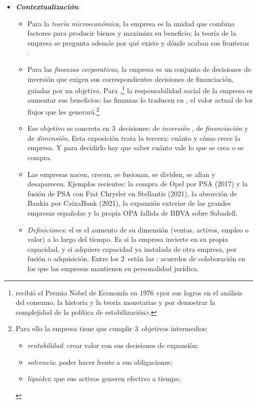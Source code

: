 \documentclass[11pt]{article}
\begin{document}
\begin{itemize}
\item \textbf{\emph{Contextualización}}:
  \begin{itemize}
  \item Para la \emph{teoría microeconómica}, la empresa es la unidad que combina factores para producir bienes y maximiza su beneficio; la teoría de la empresa se pregunta además por qué existe y dónde acaban sus fronteras .
  \item Para las \emph{finanzas corporativas}, la empresa es un conjunto de decisiones de inversión que exigen sus correspondientes decisiones de financiación, guiadas por un objetivo. Para \textcite{Friedman1970Social},\footnote{ recibió el Premio Nobel de Economía en 1976 «por sus logros en el análisis del consumo, la historia y la teoría monetarias y por demostrar la complejidad de la política de estabilización»\nocite{Nobel1976Friedman}.} la responsabilidad social de la empresa es aumentar sus beneficios; las finanzas lo traducen en , el valor actual de los flujos que les generará.\footnote{Para ello la empresa tiene que cumplir 3~objetivos intermedios:
\begin{itemize}
\item \emph{rentabilidad}: crear valor con sus decisiones de expansión;
\item \emph{solvencia}: poder hacer frente a sus obligaciones;
\item \emph{liquidez}: que sus activos generen efectivo a tiempo.
\end{itemize}}
  \item Ese objetivo se concreta en 3~decisiones: de \emph{inversión} , de \emph{financiación}  y de \emph{dimensión}. Esta exposición trata la tercera: cuánto y cómo crece la empresa. Y para decidirlo hay que saber cuánto vale lo que se crea o se compra.
  \item Las empresas nacen, crecen, se fusionan, se dividen, se alían y desaparecen. Ejemplos recientes: la compra de Opel por PSA (2017) y la fusión de PSA con Fiat Chrysler en Stellantis (2021)\nocite{AutoExpress2021Stellantis}, la absorción de Bankia por CaixaBank (2021), la expansión exterior de las grandes empresas españolas y la propia OPA fallida de BBVA sobre Sabadell.
  \item \emph{Definiciones}: el  es el aumento de su dimensión (ventas, activos, empleo o valor) a lo largo del tiempo. Es  si la empresa invierte en su propia capacidad, y  si adquiere capacidad ya instalada de otra empresa, por fusión o adquisición. Entre los 2~están las : acuerdos de colaboración en los que las empresas mantienen su personalidad jurídica.
  \end{itemize}


\end{itemize}
\end{document}
